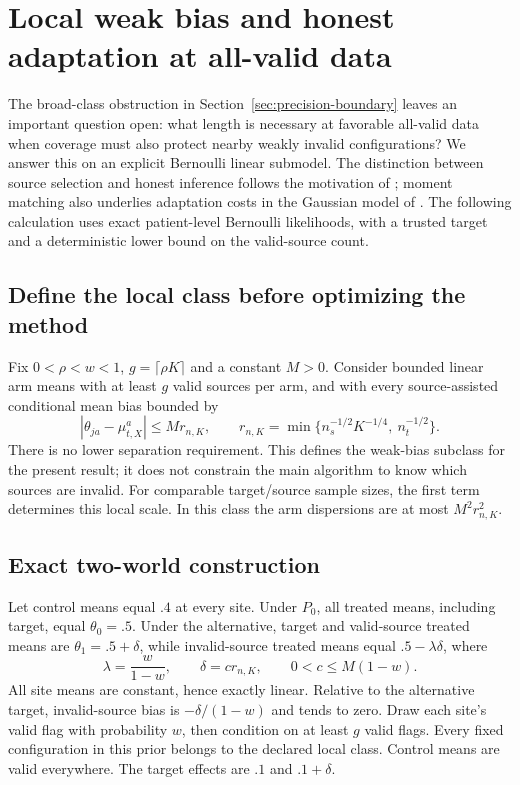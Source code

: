 \section{Local weak bias and honest adaptation at all-valid data}
\label{sec:local-precision}

The broad-class obstruction in Section~\ref{sec:precision-boundary} leaves an
important question open: what length is necessary at favorable all-valid
data when coverage must also protect nearby weakly invalid configurations?
We answer this on an explicit Bernoulli linear submodel. The distinction
between source selection and honest inference follows the motivation of
\citet{guo2023}; moment matching also underlies adaptation costs in the
Gaussian model of \citet{wang2026}. The following calculation uses exact
patient-level Bernoulli likelihoods, with a trusted target and a deterministic
lower bound on the valid-source count.

\subsection{Define the local class before optimizing the method}

Fix $0<\rho<w<1$, $g=\lceil\rho K\rceil$ and a constant $M>0$. Consider
bounded linear arm means with at least $g$ valid sources per arm, and with
every source-assisted conditional mean bias bounded by
\[
 |\theta_{ja}-\mu_{t,X}^a|\le M r_{n,K},\qquad
 r_{n,K}=\min\{n_s^{-1/2}K^{-1/4},\ n_t^{-1/2}\}.
\]
There is no lower separation requirement. This defines the weak-bias subclass
for the present result; it does not constrain the main algorithm to know
which sources are invalid. For comparable target/source sample sizes, the
first term determines this local scale. In this class the arm dispersions
are at most $M^2r_{n,K}^2$.

\subsection{Exact two-world construction}

Let control means equal $.4$ at every site. Under $P_0$, all treated means,
including target, equal $\theta_0=.5$. Under the alternative, target and
valid-source treated means are $\theta_1=.5+\delta$, while invalid-source
treated means equal $.5-\lambda\delta$, where
\[
 \lambda=\frac{w}{1-w},\qquad \delta=c r_{n,K},\qquad
 0<c\le M(1-w).
\]
All site means are constant, hence exactly linear. Relative to the alternative
target, invalid-source bias is $-\delta/(1-w)$ and tends to zero. Draw each
site's valid flag with probability $w$, then condition on at least $g$ valid
flags. Every fixed configuration in this prior belongs to the declared local
class. Control means are valid everywhere. The target effects are $.1$ and
$.1+\delta$.

